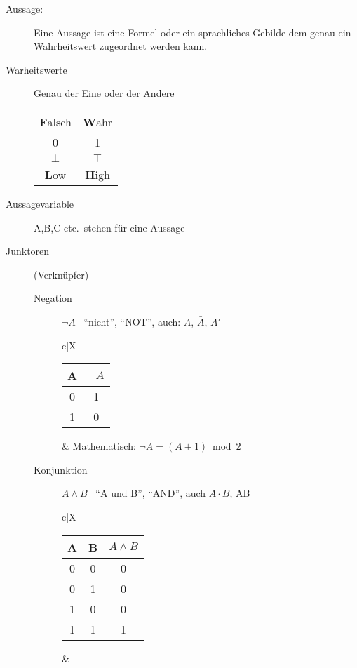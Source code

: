 \begin{description}
    \item[Aussage:] Eine Aussage ist eine Formel oder ein sprachliches Gebilde dem genau ein Wahrheitswert zugeordnet werden kann.

    \item[Warheitswerte] Genau der Eine oder der Andere \\
    \begin{tabular}{c|c}
        \textbf{F}alsch & \textbf{W}ahr \\
        0               & 1             \\
        $\bot$          & $\top$        \\
        \textbf{L}ow    & \textbf{H}igh
    \end{tabular}
    \item[Aussagevariable] A,B,C etc.\ stehen für eine Aussage
    \item[Junktoren] (Verknüpfer)
    \begin{description}
        \item[Negation] $\neg A$ \, ``nicht'', ``NOT'', auch: $A$, $\bar{A}$, $A'$ \\
        \begin{tabularx}{\linewidth}{c|X}
            \begin{tabular}[t]{c|c}
                A & $\neg A$ \\ \hline
                0 & 1        \\
                1 & 0
            \end{tabular} &
            Mathematisch: $\neg A = (A + 1) \bmod 2$ \\ \hline
        \end{tabularx}
        \item[Konjunktion] $A\wedge B$ \, ``A und B'', ``AND'', auch $A\cdot B$, AB \\
        \begin{tabularx}{\linewidth}{c|X}
            \begin{tabular}[t]{c|c||c}
                A & B & $A \wedge B$ \\ \hline\hline
                0 & 0 & 0            \\ \hline
                0 & 1 & 0            \\ \hline
                1 & 0 & 0            \\ \hline
                1 & 1 & 1
            \end{tabular} &
            \begin{tabular}[t]{ll}

\end{tabular}
\end{tabularx}
\end{description}
\end{description}
